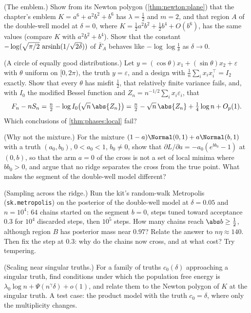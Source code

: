 \begin{refsection}
\begin{exercises}
\item \byhand (The emblem.) Show from its Newton polygon (\cref{thm:newton:plane}) that the chapter's emblem $K=a^6+a^2b^2+b^6$ has $\lambda=\frac12$ and $m=2$, and that region $A$ of the double-well model at $\delta=0$, where $K=\frac12a^2b^2+\frac12b^4+O(b^6)$, has the same values (compare $K$ with $a^2b^2+b^4$). Show that the constant $-\log(\sqrt{\pi/2}\,\operatorname{arsinh}(1/\sqrt{2\delta}))$ of $\bar F_A$ behaves like $-\log\log\frac1\delta$ as $\delta\to0$.\label{ex:phases:emblem}

\item \byhand\hard (A circle of equally good distributions.) Let $y=(\cos\theta)x_1+(\sin\theta)x_2+\varepsilon$ with $\theta$ uniform on $[0,2\pi)$, the truth $y=\varepsilon$, and a design with $\frac1n\sum_ix_ix_i^\top=I_2$ exactly. Show that every $\theta$ has misfit $\frac12$, that relatively finite variance fails, and, with $I_0$ the modified Bessel function and $Z_n=n^{-1/2}\sum_ix_i\varepsilon_i$, that
\[
F_n-nS_n=\tfrac n2-\log I_0\bigl(\sqrt n\,\abs{Z_n}\bigr)=\tfrac n2-\sqrt n\,\abs{Z_n}+\tfrac14\log n+O_p(1).
\]
Which conclusions of \cref{thm:phases:local} fail? \label{ex:phases:circle}

\item \variation (Why not the mixture.) For the mixture $(1-a)\Normal(0,1)+a\Normal(b,1)$ with a truth $(a_0,b_0)$, $0<a_0<1$, $b_0\ne0$, show that $\partial L/\partial a=-a_0(e^{bb_0}-1)$ at $(0,b)$, so that the arm $a=0$ of the cross is not a set of local minima where $bb_0>0$, and argue that no ridge separates the cross from the true point. What makes the segment of the double-well model different?\label{ex:phases:mixture}

\item \measurement (Sampling across the ridge.) Run the kit's random-walk Metropolis (\texttt{sk.metropolis}) on the posterior of the double-well model at $\delta=0.05$ and $n=10^4$: $64$ chains started on the segment $b=0$, steps tuned toward acceptance $0.3$ for $10^4$ discarded steps, then $10^5$ steps. How many chains reach $\abs b\ge\frac12$, although region $B$ has posterior mass near $0.97$? Relate the answer to $n\eta\approx140$. Then fix the step at $0.3$: why do the chains now cross, and at what cost? Try tempering.\label{ex:phases:mcmc}

\item \research (Scaling near singular truths.) For a family of truths $c_0(\delta)$ approaching a singular truth, find conditions under which the population free energy is $\lambda_0\log n+\Psi(n^\gamma\delta)+o(1)$, and relate them to the Newton polygon of $K$ at the singular truth. A test case: the product model with the truth $c_0=\delta$, where only the multiplicity changes.\label{ex:phases:scaling}


\end{exercises}
\end{refsection}
